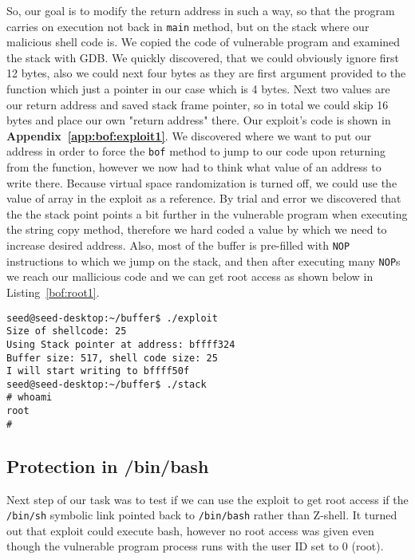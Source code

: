 \documentclass[12pt, a4paper, pdflatex]{article}
\begin{document}
So, our goal is to modify the return address in such a way, so that the program carries on execution not back in \texttt{main} method, but on the stack where our malicious shell code is. We copied the code of vulnerable program and examined the stack with GDB. We quickly discovered, that we could obviously ignore first 12 bytes, also we could next four bytes as they are first argument provided to the function which just a pointer in our case which is 4 bytes. Next two values are our return address and saved stack frame pointer, so in total we could skip 16 bytes and place our own "return address" there. Our exploit's code is shown in \textbf{Appendix~\ref{app:bof:exploit1}}.
We discovered where we want to put our address in order to force the \texttt{bof} method to jump to our code upon returning from the function, however we now had to think what value of an address to write there. Because virtual space randomization is turned off, we could use the value of  array in the exploit as a reference. By trial and error we discovered that the the stack point points a bit further in the vulnerable program when executing the string copy method, therefore we hard coded a value by which we need to increase desired address. Also, most of the buffer is pre-filled with \texttt{NOP} instructions to which we jump on the stack, and then after executing many \texttt{NOP}s we reach our mallicious code and we can get root access as shown below in Listing~\ref{bof:root1}.
\vspace{1em}
\lstset{
	captionpos=b,
	frame=single,
	language=BASH,
	breaklines=true,
	caption=Function with buffer overflow vulnerability,
	label=bof:root1,
}
\begin{lstlisting}
seed@seed-desktop:~/buffer$ ./exploit 
Size of shellcode: 25
Using Stack pointer at address: bffff324
Buffer size: 517, shell code size: 25
I will start writing to bffff50f
seed@seed-desktop:~/buffer$ ./stack 
# whoami                                                                       
root
# 
\end{lstlisting}


\subsection{Protection in /bin/bash}

Next step of our task was to test if we can use the exploit to get root access if
the \texttt{/bin/sh} symbolic link pointed back to \texttt{/bin/bash} rather than Z-shell. It turned out that exploit could execute bash, however no root access was given even though the vulnerable program  process runs with the user ID set to 0 (root). 
\end{document}
